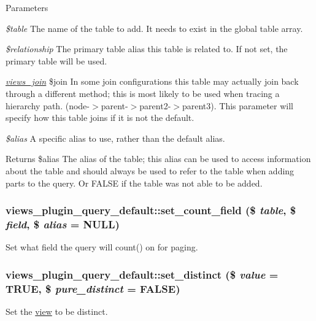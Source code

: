 \begin{DoxyParams}{Parameters}
\item[{\em \$table}]The name of the table to add. It needs to exist in the global table array. \item[{\em \$relationship}]The primary table alias this table is related to. If not set, the primary table will be used. \item[{\em \hyperlink{classviews__join}{views\_\-join}}]\$join In some join configurations this table may actually join back through a different method; this is most likely to be used when tracing a hierarchy path. (node-\/$>$parent-\/$>$parent2-\/$>$parent3). This parameter will specify how this table joins if it is not the default. \item[{\em \$alias}]A specific alias to use, rather than the default alias.\end{DoxyParams}
\begin{DoxyReturn}{Returns}
\$alias The alias of the table; this alias can be used to access information about the table and should always be used to refer to the table when adding parts to the query. Or FALSE if the table was not able to be added. 
\end{DoxyReturn}
\hypertarget{classviews__plugin__query__default_a6172cc82ea98666a7f242fd469df5123}{
\subsubsection[{set\_\-count\_\-field}]{\setlength{\rightskip}{0pt plus 5cm}views\_\-plugin\_\-query\_\-default::set\_\-count\_\-field (\$ {\em table}, \/  \$ {\em field}, \/  \$ {\em alias} = {\ttfamily NULL})}}
\label{classviews__plugin__query__default_a6172cc82ea98666a7f242fd469df5123}
Set what field the query will count() on for paging. \hypertarget{classviews__plugin__query__default_a637c0338f3140dbc78ae02620e05d8ed}{
\subsubsection[{set\_\-distinct}]{\setlength{\rightskip}{0pt plus 5cm}views\_\-plugin\_\-query\_\-default::set\_\-distinct (\$ {\em value} = {\ttfamily TRUE}, \/  \$ {\em pure\_\-distinct} = {\ttfamily FALSE})}}
\label{classviews__plugin__query__default_a637c0338f3140dbc78ae02620e05d8ed}
Set the \hyperlink{classview}{view} to be distinct.

